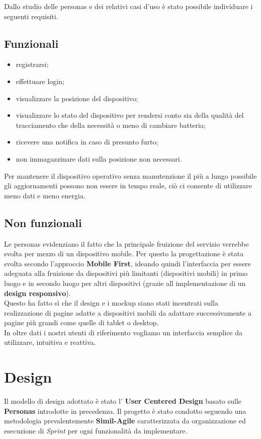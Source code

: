 \documentclass{report}
\begin{document}
Dallo studio delle personas e dei relativi casi d'uso è stato possibile individuare i seguenti requisiti.


\subsection{Funzionali}
\begin{itemize}
    \item registrarsi;
    \item effettuare login;
    \item visualizzare la posizione del dispositivo;
    \item visualizzare lo stato del dispositivo per rendersi conto sia della qualità del tracciamento che della necessità o meno di cambiare batteria;
    \item ricevere una notifica in caso di presunto furto;
    \item non immagazzinare dati sulla posizione non necessari.
\end{itemize}

Per mantenere il dispositivo operativo senza manutenzione il più a lungo possibile gli aggiornamenti possono non essere in tempo reale, ciò ci consente di utilizzare meno dati e meno energia.
\subsection{Non funzionali}
Le personas evidenziano il fatto che la principale fruizione del servizio verrebbe svolta per mezzo di un dispositivo mobile. Per questo la progettazione è stata svolta secondo l'approccio \textbf{Mobile First}, ideando quindi l'interfaccia per essere adeguata alla fruizione da dispositivi più limitanti (dispositivi mobili) in primo luogo e in secondo luogo per altri dispositivi (grazie all implementazione di un \textbf{design responsivo}). \\
Questo ha fatto sì che il design e i mockup siano stati incentrati sulla realizzazione di pagine adatte a dispositivi mobili da adattare successivamente a pagine più grandi come quelle di tablet o desktop.\\
In oltre dati i nostri utenti di riferimento vogliamo un interfaccia semplice da utilizzare, intuitiva e reattiva. 
\section{Design}
Il modello di design adottato è stato l' \textbf{User Centered Design} basato sulle \textbf{Personas} introdotte in precedenza. Il progetto è stato condotto seguendo una metodologia prevalentemente \textbf{Simil-Agile} caratterizzata da organizzazione ed esecuzione di \textit{Sprint} per ogni funzionalità da implementare.\\
\end{document}
